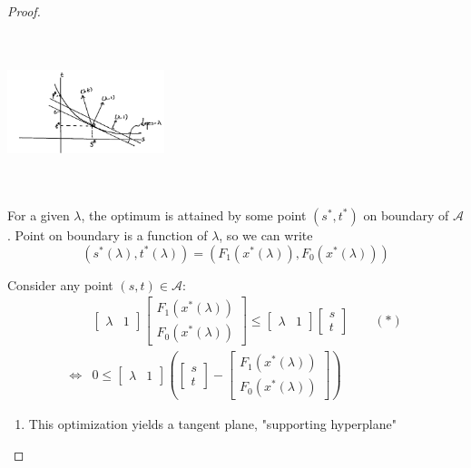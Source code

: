 \begin{proof}
\begin{marginfigure}
	\centering
	\includegraphics[width=1.8in,height=1.8in]{figures/ch10/figure1125_3.png}
\end{marginfigure}

For a given $\lambda$, the optimum is attained by some point $(s^*, t^*)$ on boundary of $\mathcal{A}$. Point on boundary is a function of $\lambda$, so we can write $$(s^*(\lambda), t^*(\lambda)) = (F_1(x^*(\lambda)), F_0(x^*(\lambda)))$$ 

Consider any point $(s,t)\in \mathcal{A}$:
\begin{align*}
	&
	\begin{bmatrix}
		\lambda &1
	\end{bmatrix}
	\begin{bmatrix}
		F_1(x^*(\lambda))\\
		F_0(x^*(\lambda))
	\end{bmatrix}
	\leq 
	\begin{bmatrix}
		\lambda &1
	\end{bmatrix}
	\begin{bmatrix}
		s\\
		t
	\end{bmatrix}\qquad  (*)\\
	\Leftrightarrow & 0\leq 
	\begin{bmatrix}
		\lambda & 1
	\end{bmatrix}
	\left(
	\begin{bmatrix}
		s\\
		t
	\end{bmatrix} 
	- 
	\begin{bmatrix}
		F_1(x^*(\lambda))\\
		F_0(x^*(\lambda))
	\end{bmatrix}\right)
\end{align*}

\begin{enumerate}
	\item This optimization yields a tangent plane, "supporting hyperplane"
	

\end{enumerate}
\end{proof}
